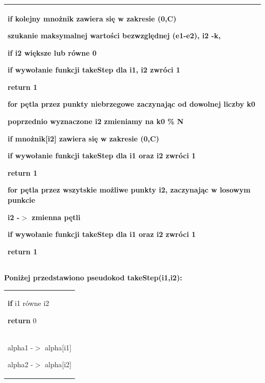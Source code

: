 \documentclass[[10pt,a4paper]{article}
\begin{document}
\begin{enumerate}
\begin{itemize}
\begin{tabular}{|p{11.5cm}|}
  \hspace{2em}\textbf{if} kolejny mnożnik zawiera się w zakresie (0,C)

   \hspace{3em}szukanie maksymalnej wartości bezwzględnej (e1-e2), i2 -k,

  \hspace{2em}\textbf{if} i2 większe lub równe 0

   \hspace{3em}\textbf{if} wywołanie funkcji takeStep dla i1, i2 zwróci 1

    \hspace{4em}return 1

 \hspace{1em}\textbf{for} pętla przez punkty niebrzegowe zaczynając od dowolnej liczby k0

  \hspace{2em}poprzednio wyznaczone i2 zmieniamy na k0 \% N

  \hspace{2em}\textbf{if} mnożnik[i2] zawiera się w zakresie (0,C)

   \hspace{3em}\textbf{if} wywołanie funkcji takeStep dla i1 oraz i2 zwróci 1

    \hspace{4em}return 1

 \hspace{1em}for pętla przez wszytskie możliwe punkty i2, zaczynając w losowym punkcie

  \hspace{2em}i2 -$>$ zmienna p\k{e}tli

   \hspace{3em}\textbf{if} wywołanie funkcji takeStep dla i1 oraz i2 zwróci 1

    \hspace{4em}return 1

\noindent 
\\ \hline
\end{tabular}
\newline
\noindent \textbf{Poniżej przedstawiono pseudokod takeStep(i1,i2):}\\
\begin{tabular}{|p{11.5cm}|} \hline
\noindent \textbf{if} i1 równe i2 
 
 \hspace{1em}\textbf {return} 0\\
 alpha1 -$>$ alpha[i1]

\noindent alpha2 -$>$ alpha[i2]


\end{tabular}
\end{itemize}
\end{enumerate}
\end{document}
